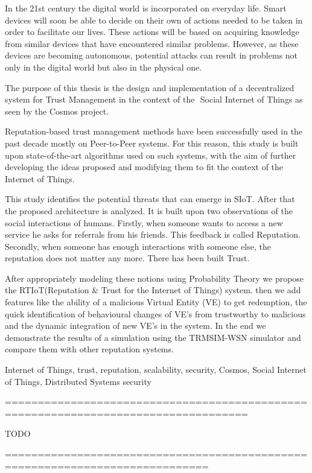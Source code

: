 \begin{abstracten}
In the 21st century the digital world is incorporated on everyday life. Smart devices will soon be able to decide on their own of actions needed to be taken in order to facilitate our lives. 
These actions will be based on acquiring knowledge from similar devices that have encountered similar problems. However, as these devices are becoming autonomous, 
potential attacks can result in problems not only in the digital world but also in the physical one.  
 
The purpose of this thesis is the design and implementation of a decentralized system for Trust Management in the context of the ​
Social Internet of Things​
 as seen by the ​Cosmos​ project. 
 
Reputation-­based trust management methods have been successfully used in the  past 
decade mostly on Peer-­to-­Peer systems. For this reason, this study is built upon 
state-­of-­the-­art algorithms used on such systems, with the aim of further developing the 
ideas proposed and modifying them to fit the context of the Internet of Things. 
 
This study identifies the potential threats that can emerge in SIoT. After that the proposed 
architecture is analyzed. It is built upon two observations of the social interactions of humans.
 Firstly, when someone wants to access a new service he asks for referrals from 
his friends. This feedback is called Reputation. Secondly, when someone has enough 
interactions with someone else, the reputation does not matter any more. There has been built Trust. 
 
After appropriately modeling these notions using Probability Theory we propose the RTIoT(Reputation \& Trust for the Internet of Things) system. then we add features like 
the ability of a malicious Virtual Entity (VE) to get redemption, the quick identification of 
behavioural changes of VE’s from trustworthy to malicious and the dynamic integration of 
new VE’s in the system. In the end we demonstrate the results of a simulation using the TRMSIM-WSN simulator and compare them with other reputation systems. 

	\begin{keywordsen}
    Internet of Things, trust, reputation, scalability, security, Cosmos, Social Internet of Things, Distributed Systems security 
	\end{keywordsen}
\end{abstracten}

\begin{acknowledgementsgr}
===================================================================================

TODO

=============================================================================
\end{acknowledgementsgr}

